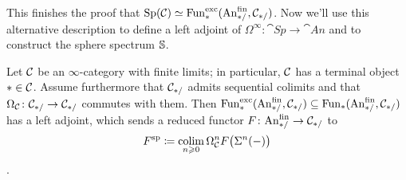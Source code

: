 This finishes the proof that $\cat{Sp}(\Cc)\simeq\Fun_*^\mathrm{exc}(\FinAn,\Cc_{*/})$. Now we'll use this alternative description to define a left adjoint of $\Omega^\infty\colon \cat{Sp}\rightarrow \cat{An}$ and to construct the sphere spectrum $\mathbb{S}$.
\begin{lem}\label{lem:Spectrification}
	Let $\mathcal{C}$ be an $\infty$-category with finite limits; in particular, $\mathcal{C}$ has a terminal object $*\in\mathcal{C}$. Assume furthermore that $\mathcal{C}_{*/}$ admits sequential colimits and that $\Omega_{\mathcal{C}}\colon \mathcal{C}_{*/}\rightarrow \mathcal{C}_{*/}$ commutes with them. Then $\Fun_*^\mathrm{exc}(\FinAn,\Cc_{*/})\subseteq \Fun_*(\FinAn,\Cc_{*/})$ has a left adjoint, which sends a reduced functor $F\colon \FinAn\rightarrow \Cc_{*/}$ to
	\begin{equation*}
		F^\mathrm{sp}\coloneqq \operatorname*{colim}_{n\geqslant 0}\Omega_{\mathcal{C}}^nF\bigl(\Sigma^n(-)\bigr)
	\end{equation*}
	.
\end{lem}
